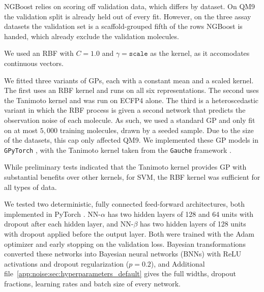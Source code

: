 NGBoost relies on scoring off validation data, which differs by dataset. On QM9 the validation split is already held out of every fit. However, on the three assay datasets the validation set is a scaffold-grouped fifth of the rows NGBoost is handed, which already exclude the validation molecules.

We used an RBF with $C = 1.0$ and $\gamma = \texttt{scale}$ as the kernel, as it accomodates continuous vectors.

We fitted three variants of GPs, each with a constant mean and a scaled kernel. The first uses an RBF kernel and runs on all six representations. The second uses the Tanimoto kernel \citep{Ralaivola2005, moss2020} and was run on ECFP4 alone. The third is a heteroscedastic variant in which the RBF process is given a second network that predicts the observation noise of each molecule. As such, we used a standard GP and only fit on at most $5{,}000$ training molecules, drawn by a seeded sample. Due to the size of the datasets, this cap only affected QM9. We implemented these GP models in \texttt{GPyTorch} \citep{gpytorch}, with the Tanimoto kernel taken from the \texttt{Gauche} framework \citep{gauche}.

While preliminary tests indicated that the Tanimoto kernel provides GP with substantial benefits over other kernels, for SVM, the RBF kernel was sufficient for all types of data.

We tested two deterministic, fully connected feed-forward architectures, both implemented in PyTorch \citep{pytorchGeometric}. NN-$\alpha$ has two hidden layers of 128 and 64 units with dropout after each hidden layer, and NN-$\beta$ has two hidden layers of 128 units with dropout applied before the output layer. Both were trained with the Adam optimizer and early stopping on the validation loss. Bayesian transformations converted these networks into Bayesian neural networks (BNNs) with ReLU activations and dropout regularization ($p=0.2$), and Additional file~\ref{app:noise:sec:hyperparameters_default} gives the full widths, dropout fractions, learning rates and batch size of every network.

